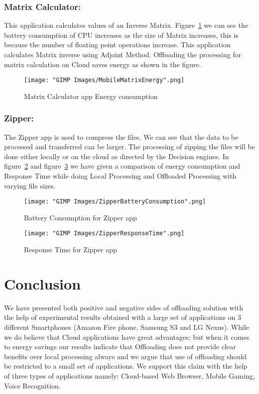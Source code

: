 \documentclass[12pt]{report}
\begin{document}
\subsection{Matrix Calculator:}
This application calculates values of an Inverse Matrix. Figure~\ref{fig:MobileMatrixEnergy} we can see the battery consumption of CPU increases as the size of Matrix increases, this is because the number of floating point operations increase. This application calculates Matrix inverse using Adjoint Method. Offloading the processing for matrix calculation on Cloud saves energy as shown in the figure.
\begin{figure}[h]
  \centering
  \texttt{[image: "GIMP Images/MobileMatrixEnergy".png]}
  \caption{Matrix Calculator app Energy consumption}
  \label{fig:MobileMatrixEnergy}
\end{figure}



\subsection{Zipper:}
The Zipper app is used to compress the files. We can see that the data to be processed and transferred
can be larger. The processing of zipping the files will be done either locally or on the cloud as directed by
the Decision engines. In figure~\ref{fig:ZipperBatteryConsumption} and figure~\ref{fig:ZipperResponseTime} we have given a comparison of energy consumption and Response Time while doing Local Processing and Offloaded Processing with varying file sizes.

\begin{figure}[h]
  \centering
  \texttt{[image: "GIMP Images/ZipperBatteryConsumption".png]}
  \caption{Battery Consumption for Zipper app}
  \label{fig:ZipperBatteryConsumption}
\end{figure}

\begin{figure}[h]
  \centering
  \texttt{[image: "GIMP Images/ZipperResponseTime".png]}
  \caption{Response Time for Zipper app}
  \label{fig:ZipperResponseTime}
\end{figure}





\chapter{Conclusion}
We have presented both positive and negative sides of offloading solution
with the help of experimental results obtained with a large set of applications on 3 different Smartphones
(Amazon Fire phone, Samsung S3 and LG Nexus). While we do believe that Cloud applications have great
advantages; but when it comes to energy savings our results indicate that Offloading does not provide clear
benefits over local processing always and we argue that use of offloading should be restricted to a small
set of applications. We support this claim with the help of three types of applications namely: Cloud-based Web Browser, Mobile Gaming, Voice Recognition. 
\end{document}
